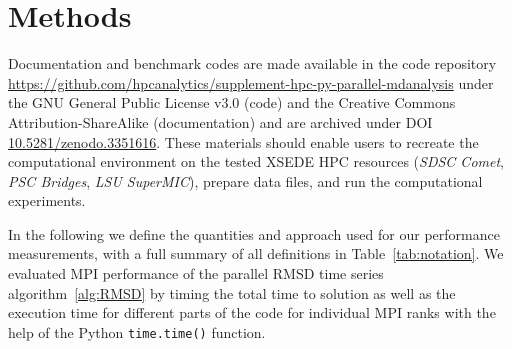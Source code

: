 
\section{Methods}
\label{sec:methods}

Documentation and benchmark codes are made available in the code repository \url{https://github.com/hpcanalytics/supplement-hpc-py-parallel-mdanalysis} under the GNU General Public License v3.0 (code) and the Creative Commons Attribution-ShareAlike (documentation) and are archived under DOI \href{https://doi.org/10.5281/zenodo.3351616}{10.5281/zenodo.3351616}.
These materials should enable users to recreate the computational environment on the tested XSEDE HPC resources (\emph{SDSC Comet}, \emph{PSC Bridges}, \emph{LSU SuperMIC}), prepare data files, and run the computational experiments.

In the following we define the quantities and approach used for our performance measurements, with a full summary of all definitions in Table~\ref{tab:notation}.
We evaluated MPI performance of the parallel RMSD time series algorithm~\ref{alg:RMSD} by timing the total time to solution as well as the execution time for different parts of the code for individual MPI ranks with the help of the Python \texttt{time.time()} function.


